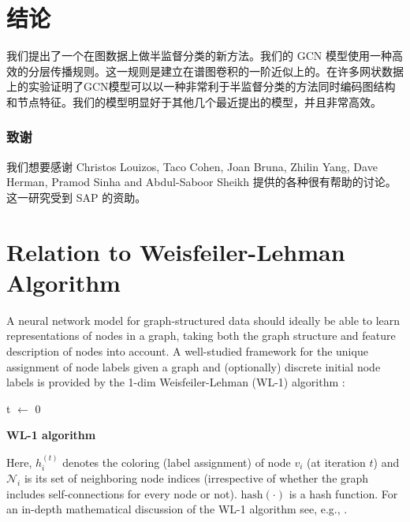 \documentclass{article} %
\makeatletter
\newcommand*{\eg}{e.g.\@\xspace}
\makeatother
\begin{document}
\section{结论}
我们提出了一个在图数据上做半监督分类的新方法。我们的 GCN 模型使用一种高效的分层传播规则。这一规则是建立在谱图卷积的一阶近似上的。在许多网状数据上的实验证明了GCN模型可以以一种非常利于半监督分类的方法同时编码图结构和节点特征。我们的模型明显好于其他几个最近提出的模型，并且非常高效。

\subsubsection*{致谢}

我们想要感谢 Christos Louizos, Taco Cohen, Joan Bruna, Zhilin Yang, Dave Herman, Pramod Sinha and Abdul-Saboor Sheikh 提供的各种很有帮助的讨论。这一研究受到 SAP 的资助。





\appendix

\section{Relation to Weisfeiler-Lehman Algorithm}
\label{sec:wl}
A neural network model for graph-structured data should ideally be able to learn representations of nodes in a graph, taking both the graph structure and feature description of nodes into account. A well-studied framework for the unique assignment of node labels given a graph and (optionally) discrete initial node labels is provided by the 1-dim Weisfeiler-Lehman (WL-1) algorithm  \citep{weisfeiler1968reduction}:

\begin{algorithm}[H]
t $\leftarrow$ 0\;
    \caption{{\bf WL-1 algorithm \citep{weisfeiler1968reduction}} \label{alg:wl1}}
\end{algorithm}

Here, $h_i^{(t)}$ denotes the coloring (label assignment) of node $v_i$ (at iteration $t$) and $\mathcal{N}_i$ is its set of neighboring node indices (irrespective of whether the graph includes self-connections for every node or not). $\mathrm{hash}(\cdot)$ is a hash function. For an in-depth mathematical discussion of the WL-1 algorithm see, \eg, \cite{douglas2011weisfeiler}.
\end{document}
